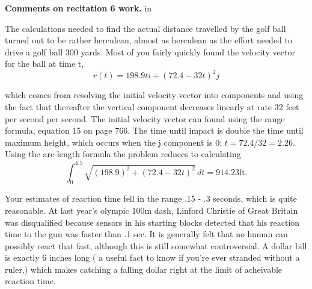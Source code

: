 {\bf Comments on recitation 6 work.}
 in

The calculations needed to find the actual distance travelled by the golf
ball turned out to be rather herculean, almost as herculean as the effort
needed to drive a golf ball 300 yards. Most of you fairly quickly found the
velocity vector for the ball at time t,
$$
r(t) = 198.9ti + (72.4-32t)^2j
$$

which  comes from resolving the initial velocity vector into components and
using the fact that thereafter the vertical component decreases linearly
at rate 32 feet per second per second. The
initial velocity vector can found using the range formula, equation 15 on
page 766. The time until impact is double the time until maximum height, 
which occurs when the j component is 0: $t = 72.4/32 = 2.26.$ Using the
arc-length formula the problem reduces to calculating
$$
\int_0^{4.5}\sqrt{(198.9)^2 + (72.4-32t)^2} \, dt = 914.23 \text{ft.}
$$

Your estimates of reaction time fell in the range .15 - .3 seconds, which
is quite reasonable. At last year's olympic 100m dash, Linford Christie of
Great Britain was disqualified because sensors in his starting blocks
detected that his reaction time to the gun was faster than .1 sec. It is
generally felt that no human can possibly react that fast, although this
is still somewhat controversial. A dollar bill is exactly 6 inches
long ( a useful fact to know if you're ever stranded without a ruler,) which
makes catching a falling dollar right at the limit of acheivable reaction
time.

\bye
